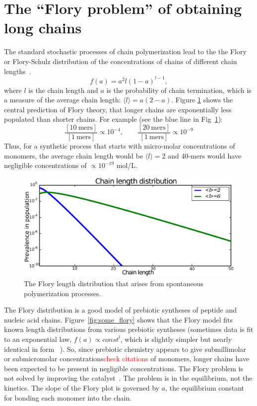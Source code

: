 \documentclass[journal=jacsat,manuscript=article,layout=twocolumn]{achemso}
\newcommand*{\pq}[1]{\left[ #1 \right]}
\newcommand*{\red}[1]{\textcolor{red}{#1}}
\begin{document}
\section{The ``Flory problem'' of obtaining long chains}
\label{sec:flory} 
The standard stochastic processes of chain polymerization lead to the the Flory or 
Flory-Schulz distribution of the concentrations of chains of different chain 
lengths~\cite{Flory1953}. 
\begin{equation}
 f(a)=a^2l(1-a)^{l-1},
\end{equation} 
where $l$ is the chain length and $a$ is the probability of chain termination, 
which is a measure of the average chain length: $\langle l \rangle = a(2- a)$.
Figure \ref{fig:flory} shows the central prediction of Flory theory, that 
longer chains are exponentially less populated than shorter chains.  For example (see the blue line 
in Fig~\ref{fig:flory}):
\begin{equation}
  \frac{\pq{10~\mathrm{mers}}}{\pq{1~\mathrm{mers}}}\propto10^{-4},\qquad\frac{\pq{20~\mathrm{mers}}}{\pq{1~\mathrm{mers}}}\propto10^{-9}
\end{equation} 
Thus, for a synthetic process that starts with micro-molar concentrations of monomers, the 
average chain length would be $\langle l \rangle = 2$ and 40-mers would have 
negligible concentrations of $\propto 10^{-19} $ mol/L. 
\begin{figure}[h!]
  \centering
  \includegraphics[width=\columnwidth]{pictures/flory2.pdf} 
  \caption{The Flory length distribution that arises from spontaneous polymerization processes.}
  \label{fig:flory}
\end{figure}

The Flory distribution is a good model of prebiotic syntheses of peptide and nucleic 
acid chains.  Figure~\ref{fig:some_flory} shows that the Flory model fits known length 
distributions from various prebiotic syntheses (sometimes data is fit to an exponential law, 
$f(a)\propto const^l$, which is slightly simpler but nearly identical in form 
~\cite{nowak2008prevolutionary,Derr2012}).  So, since prebiotic chemistry appears to give 
submillimolar or submicromolar 
concentrations\cite{Aubrey2009,Kanavarioti2001,Lazcano1996}\red{check citations} of monomers, 
longer chains have been expected to be 
present in negligible concentrations.  The Flory 
problem is not solved by improving the catalyst~\cite{Derr2012}. The problem is in the equilibrium, 
not the kinetics.  The slope of the Flory plot is governed by $a$, the equilibrium constant for 
bonding each monomer into the chain.
\end{document}
